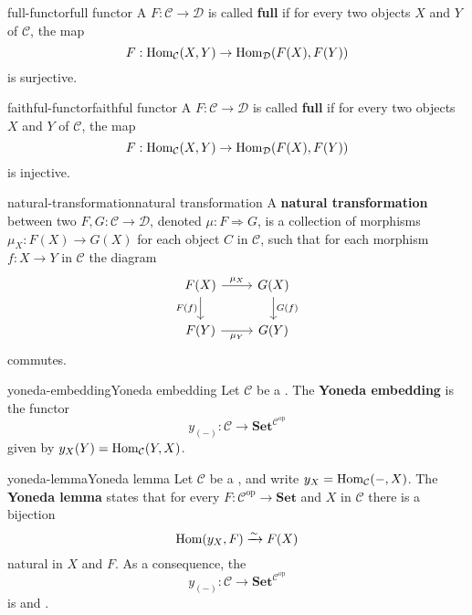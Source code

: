 \begin{topic}{full-functor}{full functor}
    A  $F : \mathcal{C} \to \mathcal{D}$ is called \textbf{full} if for every two objects $X$ and $Y$ of $\mathcal{C}$, the map
    \[ F : \text{Hom}_{\mathcal{C}}(X, Y) \to \text{Hom}_{\mathcal{D}}(F(X), F(Y)) \]
    is surjective.
\end{topic}

\begin{topic}{faithful-functor}{faithful functor}
    A  $F : \mathcal{C} \to \mathcal{D}$ is called \textbf{full} if for every two objects $X$ and $Y$ of $\mathcal{C}$, the map
    \[ F : \text{Hom}_{\mathcal{C}}(X, Y) \to \text{Hom}_{\mathcal{D}}(F(X), F(Y)) \]
    is injective.
\end{topic}

\begin{topic}{natural-transformation}{natural transformation}
    A \textbf{natural transformation} between two  $F, G : \mathcal{C} \to \mathcal{D}$, denoted $\mu : F \Rightarrow G$, is a collection of morphisms $\mu_X : F(X) \to G(X)$ for each object $C$ in $\mathcal{C}$, such that for each morphism $f : X \to Y$ in $\mathcal{C}$ the diagram
    \[ \begin{tikzcd} F(X) \arrow{r}{\mu_X} \arrow[swap]{d}{F(f)} & G(X) \arrow{d}{G(f)} \\ F(Y) \arrow[swap]{r}{\mu_Y} & G(Y) \end{tikzcd} \]
    commutes. 
\end{topic}

\begin{topic}{yoneda-embedding}{Yoneda embedding}
    Let $\mathcal{C}$ be a . The \textbf{Yoneda embedding} is the functor
    \[ y_{(-)} : \mathcal{C} \to \textbf{Set}^{\mathcal{C}^\text{op}} \]
    given by $y_X(Y) = \text{Hom}_{\mathcal{C}}(Y, X)$.
\end{topic}

\begin{topic}{yoneda-lemma}{Yoneda lemma}
    Let $\mathcal{C}$ be a , and write $y_X = \text{Hom}_{\mathcal{C}}(-, X)$. The \textbf{Yoneda lemma} states that for every $F : \mathcal{C}^\text{op} \to \textbf{Set}$ and $X$ in $\mathcal{C}$ there is a bijection
    \[ \text{Hom}(y_X, F) \xrightarrow{\sim} F(X)  \]
    natural in $X$ and $F$. As a consequence, the 
    \[ y_{(-)} : \mathcal{C} \to \textbf{Set}^{\mathcal{C}^\text{op}} \]
    is  and .
\end{topic}

